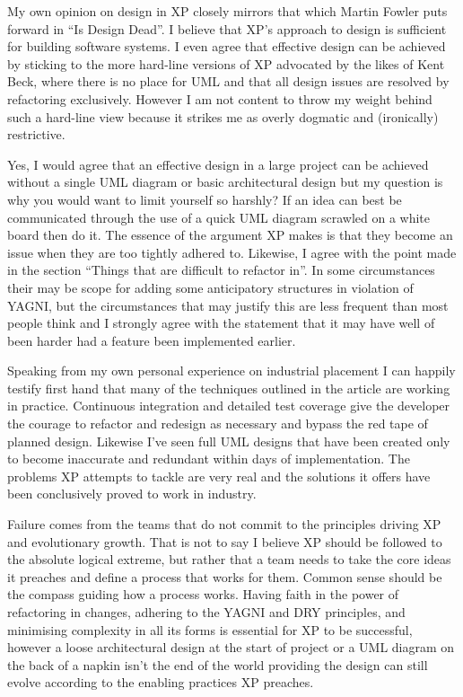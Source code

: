 \documentclass[paper=a4, fontsize=11pt]{scrartcl}	%
\numberwithin{equation}{section}															%
\numberwithin{figure}{section}																%
\numberwithin{table}{section}
\begin{document}
My own opinion on design in XP closely mirrors that which Martin Fowler puts forward in ``Is Design Dead''. I believe that XP's approach to design is sufficient for building software systems. I even agree that effective design can be achieved by sticking to the more hard-line versions of XP advocated by the likes of Kent Beck, where there is no place for UML and that all design issues are resolved by refactoring exclusively. However I am not content to throw my weight behind such a hard-line view because it strikes me as overly dogmatic and (ironically) restrictive.

Yes, I would agree that an effective design in a large project can be achieved without a single UML diagram or basic architectural  design but my question is why you would want to limit yourself so harshly? If an idea can best be communicated through the use of a quick UML diagram scrawled on a white board then do it. The essence of the argument XP makes is that they become an issue when they are too tightly adhered to. Likewise, I agree with the point made in the section ``Things that are difficult to refactor in''. In some circumstances their may be scope for adding some anticipatory structures in violation of YAGNI, but the circumstances that may justify this are less frequent than most people think and I strongly agree with the statement that it may have well of been harder had a feature been implemented earlier.

Speaking from my own personal experience on industrial placement I can happily testify first hand that many of the techniques outlined in the article are working in practice. Continuous integration and detailed test coverage give the developer the courage to refactor and redesign as necessary and bypass the red tape of planned design. Likewise I've seen full UML designs that have been created only to become inaccurate and redundant within days of implementation. The problems XP attempts to tackle are very real and the solutions it offers have been conclusively proved to work in industry. 

Failure comes from the teams that do not commit to the principles driving XP and evolutionary growth. That is not to say I believe XP should be followed to the absolute logical extreme, but rather that a team needs to take the core ideas it preaches and define a process that works for them. Common sense should be the compass guiding how a process works. Having faith in the power of refactoring in changes, adhering to the YAGNI and DRY principles, and minimising complexity in all its forms is essential for XP to be successful, however a loose architectural design at the start of project or a UML diagram on the back of a napkin isn't the end of the world providing the design can still evolve according to the enabling practices XP preaches.
\end{document}
